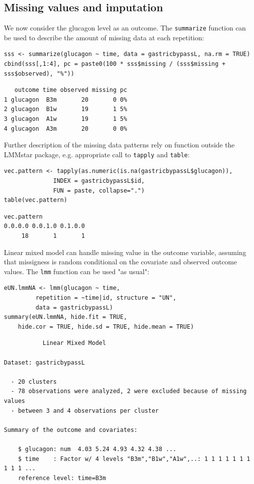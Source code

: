 \documentclass[12pt]{article}
\begin{document}
\subsection{Missing values and imputation}
\label{sec:org1a1f766}


We now consider the glucagon level as an outcome. The \texttt{summarize}
function can be used to describe the amount of missing data at each
repetition:
\lstset{language=r,label= ,caption= ,captionpos=b,numbers=none}
\begin{lstlisting}
sss <- summarize(glucagon ~ time, data = gastricbypassL, na.rm = TRUE)
cbind(sss[,1:4], pc = paste0(100 * sss$missing / (sss$missing + sss$observed), "%"))
\end{lstlisting}

\begin{verbatim}
   outcome time observed missing pc
1 glucagon  B3m       20       0 0%
2 glucagon  B1w       19       1 5%
3 glucagon  A1w       19       1 5%
4 glucagon  A3m       20       0 0%
\end{verbatim}


Further description of the missing data patterns rely on function
outside the LMMstar package, e.g. appropriate call to \texttt{tapply} and
\texttt{table}:
\lstset{language=r,label= ,caption= ,captionpos=b,numbers=none}
\begin{lstlisting}
vec.pattern <- tapply(as.numeric(is.na(gastricbypassL$glucagon)),
		      INDEX = gastricbypassL$id,
		      FUN = paste, collapse=".")
table(vec.pattern)
\end{lstlisting}

\begin{verbatim}
vec.pattern
0.0.0.0 0.0.1.0 0.1.0.0 
     18       1       1
\end{verbatim}


Linear mixed model can handle missing value in the outcome variable,
assuming that missigness is random conditional on the covariate and
observed outcome values. The \texttt{lmm} function can be used "as usual":
\lstset{language=r,label= ,caption= ,captionpos=b,numbers=none}
\begin{lstlisting}
eUN.lmmNA <- lmm(glucagon ~ time,
		 repetition = ~time|id, structure = "UN",
		 data = gastricbypassL)
summary(eUN.lmmNA, hide.fit = TRUE,
	hide.cor = TRUE, hide.sd = TRUE, hide.mean = TRUE)
\end{lstlisting}

\begin{verbatim}
           Linear Mixed Model 
 
Dataset: gastricbypassL 

  - 20 clusters 
  - 78 observations were analyzed, 2 were excluded because of missing values 
  - between 3 and 4 observations per cluster 

Summary of the outcome and covariates: 

    $ glucagon: num  4.03 5.24 4.93 4.32 4.38 ...
    $ time    : Factor w/ 4 levels "B3m","B1w","A1w",..: 1 1 1 1 1 1 1 1 1 1 ...
    reference level: time=B3m
\end{verbatim}
\end{document}

